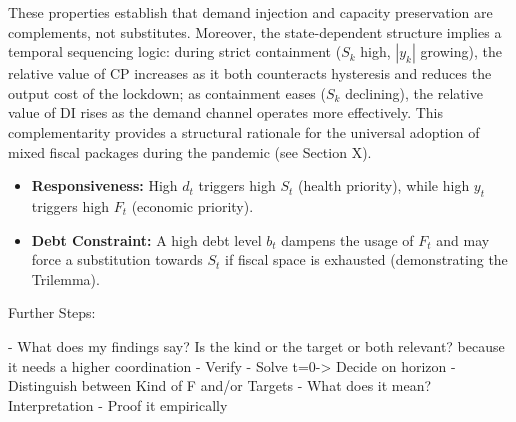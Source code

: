 These properties establish that demand injection and capacity preservation are complements, not substitutes. Moreover, the state-dependent structure implies a temporal sequencing logic: during strict containment ($S_k$ high, $|y_k|$ growing), the relative value of CP increases as it both counteracts hysteresis and reduces the output cost of the lockdown; as containment eases ($S_k$ declining), the relative value of DI rises as the demand channel operates more effectively. This complementarity provides a structural rationale for the universal adoption of mixed fiscal packages during the pandemic (see Section X).




















































\begin{itemize}
    \item \textbf{Responsiveness:} High $d_t$ triggers high $S_t$ (health priority), while high $y_t$ triggers high $F_t$ (economic priority).
    \item \textbf{Debt Constraint:} A high debt level $b_t$ dampens the usage of $F_t$ and may force a substitution towards $S_t$ if fiscal space is exhausted (demonstrating the Trilemma).
\end{itemize}


Further Steps:

- What does my findings say? Is the kind or the target or both relevant? because it needs a higher coordination
- Verify
- Solve t=0-> Decide on horizon
- Distinguish between Kind of F and/or Targets
- What does it mean? Interpretation
- Proof it empirically



